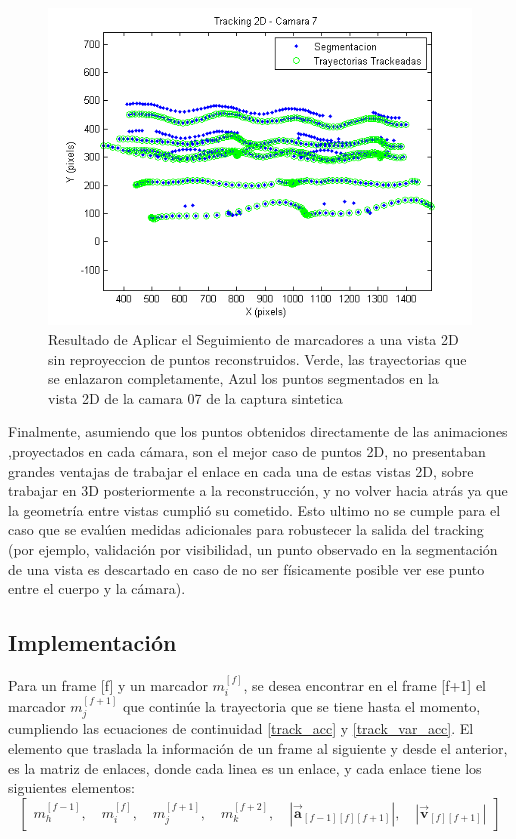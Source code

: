 \begin{figure}[hbt]
\begin{center}
\includegraphics[scale=0.7]{img/Tracking/011_tracking_2D_camara_07.png}
\end{center}
\caption{Resultado de Aplicar el Seguimiento de marcadores a una vista 2D sin reproyeccion de puntos reconstruidos. Verde, las trayectorias que se enlazaron completamente, Azul los puntos segmentados en la vista 2D de la camara 07 de la captura sintetica}
\label{tracking_2D_cam_07}
\end{figure}

Finalmente, asumiendo que los puntos obtenidos directamente de las animaciones ,proyectados en cada cámara, son el mejor caso de puntos 2D, no presentaban grandes ventajas de trabajar el enlace en cada una de estas vistas 2D, sobre trabajar en 3D posteriormente a la reconstrucción, y no volver hacia atrás ya que la geometría entre vistas cumplió su cometido. Esto ultimo no se cumple para el caso que se evalúen medidas adicionales para robustecer la salida del tracking (por ejemplo, validación por visibilidad, un punto observado en la segmentación de una vista es descartado en caso de no ser físicamente posible ver ese punto entre el cuerpo y la cámara).

\subsection{Implementación}

Para un frame [f] y un marcador $m_{i}^{[f]}$, se desea encontrar en el frame [f+1] el marcador $m_{j}^{[f+1]}$ que continúe la trayectoria que se tiene hasta el momento, cumpliendo las ecuaciones de continuidad \ref{track_acc} y \ref{track_var_acc}. El elemento que traslada la información de un frame al siguiente y desde el anterior, es la matriz de enlaces, donde cada linea es un enlace, y cada enlace tiene los siguientes elementos:
\begin{equation}
\begin{bmatrix}
  m_{h}^{[f-1]} ,\quad m_{i}^{[f]} ,\quad m_{j}^{[f+1]} ,\quad m_{k}^{[f+2]} ,\quad \left|\boldsymbol{\overrightarrow{a}}_{[f-1][f][f+1]}\right| ,\quad \left|\boldsymbol{\overrightarrow{v}}_{[f][f+1]}\right|
\end{bmatrix}
\end{equation}

